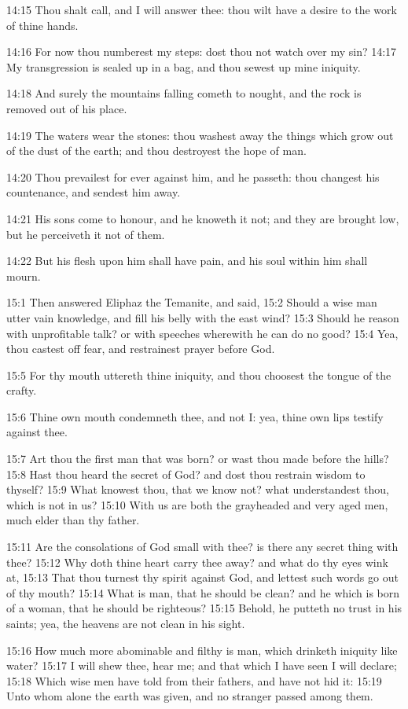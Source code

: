 14:15 Thou shalt call, and I will answer thee: thou wilt have a desire to the work of thine hands.

14:16 For now thou numberest my steps: dost thou not watch over my sin?  14:17 My transgression is sealed up in a bag, and thou sewest up mine iniquity.

14:18 And surely the mountains falling cometh to nought, and the rock is removed out of his place.

14:19 The waters wear the stones: thou washest away the things which grow out of the dust of the earth; and thou destroyest the hope of man.

14:20 Thou prevailest for ever against him, and he passeth: thou changest his countenance, and sendest him away.

14:21 His sons come to honour, and he knoweth it not; and they are brought low, but he perceiveth it not of them.

14:22 But his flesh upon him shall have pain, and his soul within him shall mourn.

15:1 Then answered Eliphaz the Temanite, and said, 15:2 Should a wise man utter vain knowledge, and fill his belly with the east wind?  15:3 Should he reason with unprofitable talk? or with speeches wherewith he can do no good?  15:4 Yea, thou castest off fear, and restrainest prayer before God.

15:5 For thy mouth uttereth thine iniquity, and thou choosest the tongue of the crafty.

15:6 Thine own mouth condemneth thee, and not I: yea, thine own lips testify against thee.

15:7 Art thou the first man that was born? or wast thou made before the hills?  15:8 Hast thou heard the secret of God? and dost thou restrain wisdom to thyself?  15:9 What knowest thou, that we know not?  what understandest thou, which is not in us?  15:10 With us are both the grayheaded and very aged men, much elder than thy father.

15:11 Are the consolations of God small with thee? is there any secret thing with thee?  15:12 Why doth thine heart carry thee away? and what do thy eyes wink at, 15:13 That thou turnest thy spirit against God, and lettest such words go out of thy mouth?  15:14 What is man, that he should be clean? and he which is born of a woman, that he should be righteous?  15:15 Behold, he putteth no trust in his saints; yea, the heavens are not clean in his sight.

15:16 How much more abominable and filthy is man, which drinketh iniquity like water?  15:17 I will shew thee, hear me; and that which I have seen I will declare; 15:18 Which wise men have told from their fathers, and have not hid it: 15:19 Unto whom alone the earth was given, and no stranger passed among them.

